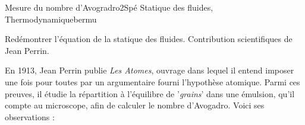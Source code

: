 
\begin{exercise}{Mesure du nombre d'Avogradro}{2}{Spé}
{Statique des fluides, Thermodynamique}{bermu}

\begin{questions}
    \questioncours\label{que:perrin} Redémontrer l'équation de la statique des fluides.
    \questionbonus Contribution scientifiques de Jean Perrin.
\begin{EnvUplevel}
En 1913, Jean Perrin publie \emph{Les Atomes}, ouvrage dans lequel il entend imposer une fois pour toutes par un argumentaire fourni l'hypothèse atomique. Parmi ces preuves, il étudie la répartition à l'équilibre de '\emph{grains}' dans une émulsion, qu'il compte au microscope, afin de calculer le nombre d'Avogadro. Voici ses observations :


\end{EnvUplevel}
\end{questions}
\end{exercise}
